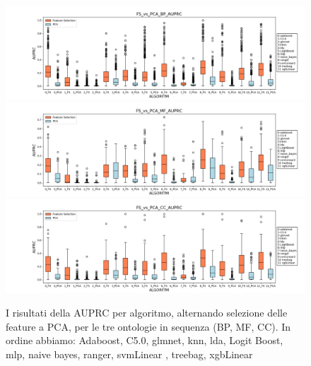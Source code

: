 \documentclass[12pt]{report}
\begin{document}
\begin{figure}[h!]
\centering
\hspace*{-0.9in}
\includegraphics[scale=0.43]{./images/FS_vs_PCA_BP_AUPRC.png}
\hspace*{-0.9in}
\includegraphics[scale=0.43]{./images/FS_vs_PCA_MF_AUPRC.png}
\hspace*{-0.9in}
\includegraphics[scale=0.43]{./images/FS_vs_PCA_CC_AUPRC.png}
\caption{\footnotesize{I risultati della AUPRC per algoritmo, alternando selezione delle feature a PCA, per le tre ontologie in sequenza (BP, MF, CC). In ordine abbiamo: Adaboost, C5.0, glmnet, knn, lda, Logit Boost, mlp, naive bayes, ranger, svmLinear , treebag, xgbLinear}}
\label{versusAUPRC}
\end{figure}
\end{document}
